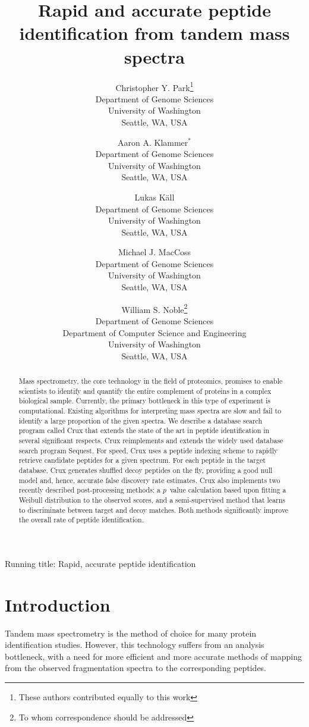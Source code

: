 \documentclass[12pt]{article}
\title{Rapid and accurate peptide identification from tandem mass spectra}
\author{Christopher Y. Park\footnote{These authors contributed equally 
to this work}\\
Department of Genome Sciences\\
University of Washington\\
Seattle, WA, USA
\and
Aaron A. Klammer$^*$\\
Department of Genome Sciences\\
University of Washington\\
Seattle, WA, USA
\and
Lukas K\"{a}ll\\
Department of Genome Sciences\\
University of Washington\\
Seattle, WA, USA
\and
Michael J. MacCoss\\
Department of Genome Sciences\\
University of Washington\\
Seattle, WA, USA
\and
William S. Noble\footnote{To whom correspondence should
  be addressed}\\
Department of Genome Sciences\\
Department of Computer Science and Engineering\\
University of Washington\\
Seattle, WA, USA
}
\begin{document}
\maketitle

\noindent Running title: {\sc Rapid, accurate peptide identification}




\clearpage

\begin{abstract}

\noindent
Mass spectrometry, the core technology in the field of proteomics,
promises to enable scientists to identify and quantify the entire
complement of proteins in a complex biological sample.  Currently, the
primary bottleneck in this type of experiment is computational.
Existing algorithms for interpreting mass spectra are slow and fail to
identify a large proportion of the given spectra.  We describe a
database search program called Crux that extends the state of the art
in peptide identification in several significant respects.  Crux
reimplements and extends the widely used database search program {\sc
Sequest}.  For speed, Crux uses a peptide indexing scheme to rapidly
retrieve candidate peptides for a given spectrum.  For each peptide in
the target database, Crux generates shuffled decoy peptides on the
fly, providing a good null model and, hence, accurate false discovery
rate estimates.  Crux also implements two recently described
post-processing methods: a $p$~value calculation based upon fitting a
Weibull distribution to the observed scores, and a semi-supervised
method that learns to discriminate between target and decoy matches.
Both methods significantly improve the overall rate of peptide
identification.
\end{abstract}

\clearpage

\section{Introduction}

Tandem mass spectrometry is the method of choice for many protein
identification studies.  However, this technology suffers from an
analysis bottleneck, with a need for more efficient and more accurate
methods of mapping from the observed fragmentation spectra to the
corresponding peptides.
\end{document}
